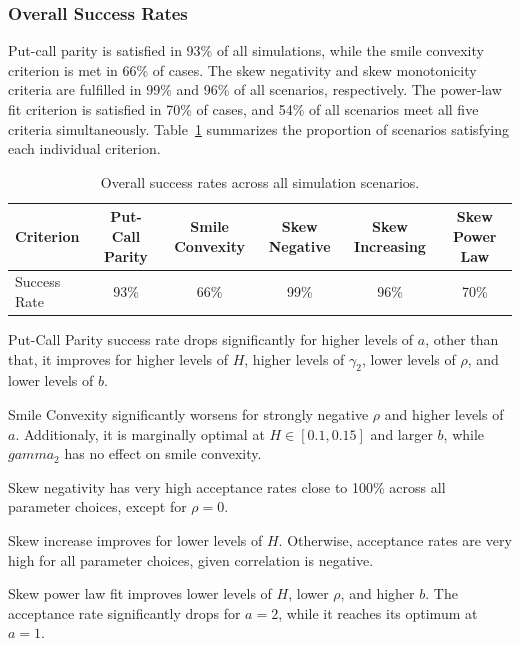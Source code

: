 \subsubsection*{Overall Success Rates}
Put-call parity is satisfied in 93\% of all simulations, while the smile convexity criterion is met in 66\% of cases. The skew negativity and skew monotonicity criteria are fulfilled in 99\% and 96\% of all scenarios, respectively. The power-law fit criterion is satisfied in 70\% of cases, and 54\% of all scenarios meet all five criteria simultaneously. Table~\ref{tab:OverallSuccessRates} summarizes the proportion of scenarios satisfying each individual criterion.
\begin{table}[H]
    \centering
    \small
    \begin{tabular}{lccccc}
        \toprule
        Criterion & Put-Call Parity & Smile Convexity & Skew Negative & Skew Increasing & Skew Power Law \\
        \midrule
        Success Rate & 93\% & 66\% & 99\% & 96\% & 70\% \\
        \bottomrule
    \end{tabular}
    \caption{Overall success rates across all simulation scenarios.}
    \label{tab:OverallSuccessRates}
\end{table}

Put-Call Parity success rate drops significantly for higher levels of $a$, other than that, it improves for higher levels of $H$, higher levels of $\gamma_2$, lower levels of $\rho$, and lower levels of $b$.

Smile Convexity significantly worsens for strongly negative $\rho$ and higher levels of $a$. Additionaly, it is marginally optimal at $H \in [0.1, 0.15]$ and larger $b$, while $gamma_2$ has no effect on smile convexity.

Skew negativity has very high acceptance rates close to 100\% across all parameter choices, except for $\rho = 0$.

Skew increase improves for lower levels of $H$. Otherwise, acceptance rates are very high for all parameter choices, given correlation is negative.

Skew power law fit improves lower levels of $H$, lower $\rho$, and higher $b$. The acceptance rate significantly drops for $a = 2$, while it reaches its optimum at $a = 1$.


